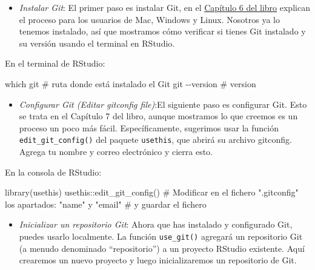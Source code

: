 \documentclass[
  letterpaper,
  DIV=11,
  numbers=noendperiod]{scrreprt}
\newenvironment{Shaded}{\begin{snugshade}}{\end{snugshade}}
\newcommand{\CommentTok}[1]{\textcolor[rgb]{0.37,0.37,0.37}{#1}}
\newcommand{\FunctionTok}[1]{\textcolor[rgb]{0.28,0.35,0.67}{#1}}
\newcommand{\NormalTok}[1]{\textcolor[rgb]{0.00,0.23,0.31}{#1}}
\newcommand{\SpecialCharTok}[1]{\textcolor[rgb]{0.37,0.37,0.37}{#1}}
\providecommand{\tightlist}{%
  \setlength{\itemsep}{0pt}\setlength{\parskip}{0pt}}\usepackage{longtable,booktabs,array}
\begin{document}
\begin{itemize}
\tightlist
\item
  {\emph{Instalar Git}}: El primer paso es instalar Git, en el
  \href{https://happygitwithr.com/install-git}{Capítulo 6 del libro}
  explican el proceso para los usuarios de Mac, Windows y Linux.
  Nosotros ya lo tenemos instalado, así que mostramos cómo verificar si
  tienes Git instalado y su versión usando el terminal en RStudio.
\end{itemize}

En el terminal de RStudio:

\begin{Shaded}
\begin{Highlighting}[]
\NormalTok{which git }\CommentTok{\# ruta donde está instalado el Git}
\NormalTok{git }\SpecialCharTok{{-}{-}}\NormalTok{version }\CommentTok{\# version}
\end{Highlighting}
\end{Shaded}

\begin{itemize}
\tightlist
\item
  {\emph{Configurar Git (Editar gitconfig file)}}:El siguiente paso es
  configurar Git. Esto se trata en el Capítulo 7 del libro, aunque
  mostramos lo que creemos es un proceso un poco más fácil.
  Específicamente, sugerimos usar la función
  \texttt{edit\_git\_config()} del paquete \texttt{usethis}, que abrirá
  su archivo gitconfig. Agrega tu nombre y correo electrónico y cierra
  esto.
\end{itemize}

En la consola de RStudio:

\begin{Shaded}
\begin{Highlighting}[]
\FunctionTok{library}\NormalTok{(usethis)}
\NormalTok{usethis}\SpecialCharTok{::}\FunctionTok{edit\_git\_config}\NormalTok{()}
\CommentTok{\# Modificar en el fichero ".gitconfig" los apartados: "name" y "email" }
\CommentTok{\# y guardar el fichero}
\end{Highlighting}
\end{Shaded}

\begin{itemize}
\tightlist
\item
  {\emph{Inicializar un repositorio Git}}: Ahora que has instalado y
  configurado Git, puedes usarlo localmente. La función
  \texttt{use\_git()} agregará un repositorio Git (a menudo denominado
  ``repositorio'') a un proyecto RStudio existente. Aquí crearemos un
  nuevo proyecto y luego inicializaremos un repositorio de Git.
\end{itemize}
\end{document}
